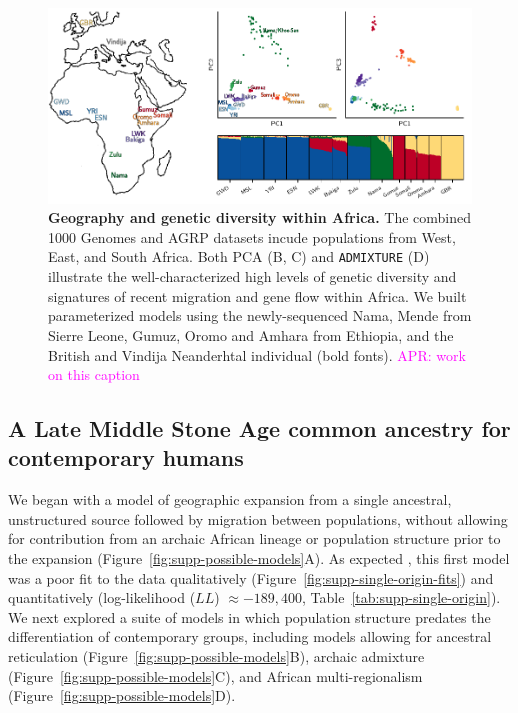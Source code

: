 \documentclass{article}
\newcommand{\aprcomment}[1]{{\textcolor{magenta}{APR: #1}}}
\begin{document}
\begin{figure}[ht!]
    \centering
    \includegraphics{figures/fig1.pdf}
    \caption{
        \textbf{Geography and genetic diversity within Africa.}
        The combined 1000 Genomes and AGRP datasets incude populations from
        West, East, and South Africa. Both PCA (B, C) and \texttt{ADMIXTURE}
        (D) illustrate the well-characterized high levels of genetic diversity
        and signatures of recent migration and gene flow within Africa.
        We built parameterized models using the newly-sequenced Nama, Mende
        from Sierre Leone, Gumuz, Oromo and Amhara from Ethiopia, and the
        British and Vindija Neanderhtal individual (bold fonts).
        \aprcomment{work on this caption}
    }
    \label{fig:1}
\end{figure}
   
\subsection*{A Late Middle Stone Age common ancestry for contemporary humans}

We began with a model of geographic expansion from a single ancestral,
unstructured source followed by migration between populations, without allowing
for contribution from an archaic African lineage or population structure prior
to the expansion (Figure~\ref{fig:supp-possible-models}A). As expected
\citep{Ragsdale2019-nt}, this first model was a poor fit to the data
qualitatively (Figure~\ref{fig:supp-single-origin-fits}) and quantitatively
(log-likelihood ($LL$) $\approx -189,400$, Table~\ref{tab:supp-single-origin}).
We next explored a suite of models in which population structure predates the
differentiation of contemporary groups, including models allowing for ancestral
reticulation (Figure~\ref{fig:supp-possible-models}B), archaic admixture
(Figure~\ref{fig:supp-possible-models}C), and African multi-regionalism
(Figure~\ref{fig:supp-possible-models}D).
\end{document}
